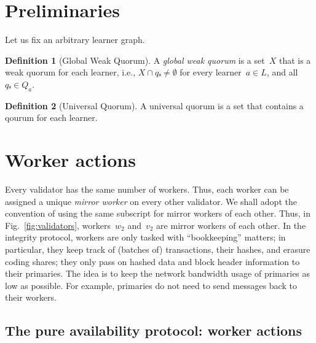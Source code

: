 \documentclass{article}
\theoremstyle{definition}
\newtheorem{definition}{Definition}
\newcommand{\fig}[1][]{Fig.~}
\newcommand{\Learner}{%
  \ensuremath{L}
}
\newcommand{\Q}[1]{%
  Q_{#1}%
}
\begin{document}
\section{Preliminaries}
\label{sec:preliminaries}

Let us fix an arbitrary learner graph. 

\begin{definition}[Global Weak Quorum]
  \label{def:global-weak-quorum}
  A %
  \emph{global weak quorum} %
  is a set~\(X\) that is a weak quorum for each learner,  %
  i.e., \(X ∩ qₐ ≠ ∅\) %
  for every learner~\(a ∈ \Learner\), and %
  all \(qₐ ∈ \Q{a}\).
\end{definition}

\begin{definition}[Universal Quorum]
  \label{def:universal-quorum}
  A universal quorum is a set
  that contains a qourum for each learner. 
\end{definition}


\section{Worker actions}
\label{sec:worker-actions}
Every validator has the same number of workers. 
Thus,
each worker can be assigned a unique \emph{mirror worker} 
on every other validator.
We shall adopt the convention of using the same subscript
for mirror workers of each other. %
Thus,
in \fig\ref{fig:validators},
workers~\(w_2\) and~\(v_2\) are mirror workers of each other.
In the integrity protocol,
workers are only tasked with “bookkeeping” matters; 
in particular,
they keep track of (batches of) transactions,
their hashes,
and erasure coding shares;
they only pass on hashed data and 
block header information to their primaries.
The idea is to keep the network bandwidth usage of primaries 
as low as possible. 
For example,
primaries do not need to send messages back to their workers. 

\subsection{The pure availability protocol: worker actions}
\label{sec:base-protocol}
\end{document}
